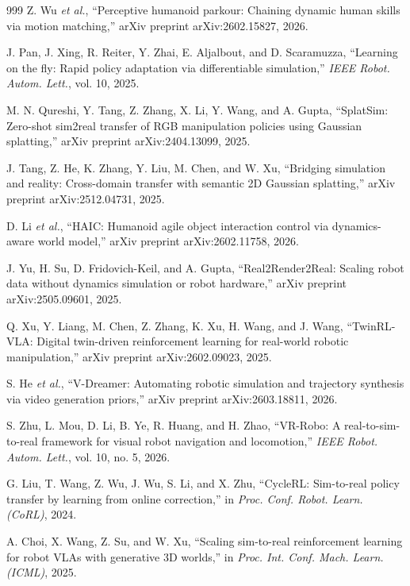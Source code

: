 \documentclass[12pt,a4paper,oneside]{report}
\begin{document}
\begin{thebibliography}{999}
Z. Wu \textit{et al.}, ``Perceptive humanoid parkour: Chaining dynamic human skills via motion matching,'' arXiv preprint arXiv:2602.15827, 2026.

J. Pan, J. Xing, R. Reiter, Y. Zhai, E. Aljalbout, and D. Scaramuzza, ``Learning on the fly: Rapid policy adaptation via differentiable simulation,'' \textit{IEEE Robot. Autom. Lett.}, vol. 10, 2025.

M. N. Qureshi, Y. Tang, Z. Zhang, X. Li, Y. Wang, and A. Gupta, ``{SplatSim}: Zero-shot sim2real transfer of {RGB} manipulation policies using Gaussian splatting,'' arXiv preprint arXiv:2404.13099, 2025.

J. Tang, Z. He, K. Zhang, Y. Liu, M. Chen, and W. Xu, ``Bridging simulation and reality: Cross-domain transfer with semantic 2D Gaussian splatting,'' arXiv preprint arXiv:2512.04731, 2025.

D. Li \textit{et al.}, ``{HAIC}: Humanoid agile object interaction control via dynamics-aware world model,'' arXiv preprint arXiv:2602.11758, 2026.

J. Yu, H. Su, D. Fridovich-Keil, and A. Gupta, ``{Real2Render2Real}: Scaling robot data without dynamics simulation or robot hardware,'' arXiv preprint arXiv:2505.09601, 2025.

Q. Xu, Y. Liang, M. Chen, Z. Zhang, K. Xu, H. Wang, and J. Wang, ``{TwinRL-VLA}: Digital twin-driven reinforcement learning for real-world robotic manipulation,'' arXiv preprint arXiv:2602.09023, 2025.

S. He \textit{et al.}, ``{V-Dreamer}: Automating robotic simulation and trajectory synthesis via video generation priors,'' arXiv preprint arXiv:2603.18811, 2026.

S. Zhu, L. Mou, D. Li, B. Ye, R. Huang, and H. Zhao, ``{VR-Robo}: A real-to-sim-to-real framework for visual robot navigation and locomotion,'' \textit{IEEE Robot. Autom. Lett.}, vol. 10, no. 5, 2026.

G. Liu, T. Wang, Z. Wu, J. Wu, S. Li, and X. Zhu, ``{CycleRL}: Sim-to-real policy transfer by learning from online correction,'' in \textit{Proc. Conf. Robot. Learn. (CoRL)}, 2024.

A. Choi, X. Wang, Z. Su, and W. Xu, ``Scaling sim-to-real reinforcement learning for robot VLAs with generative 3D worlds,'' in \textit{Proc. Int. Conf. Mach. Learn. (ICML)}, 2025.


\end{thebibliography}
\end{document}

